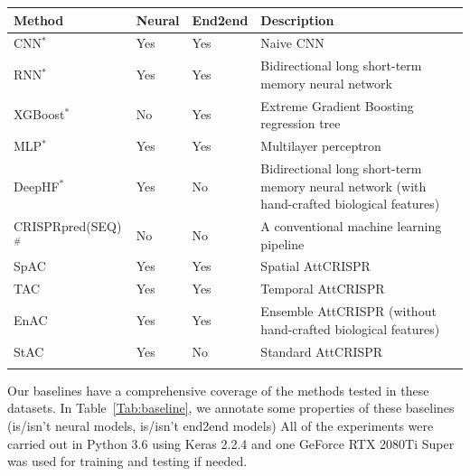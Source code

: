 \documentclass{bioinfo}
\begin{document}
\begin{table}[!tpb]
    {\begin{tabular}{@{}lllp{3.5cm}l@{}}\toprule
        Method & Neural & End2end & Description\\\midrule
        CNN$^*$ & Yes & Yes & Naive CNN\\
        RNN$^*$ & Yes & Yes & Bidirectional long short-term memory neural network\\
        XGBoost$^*$ & No & Yes & Extreme Gradient Boosting regression tree\\
        MLP$^*$ & Yes & Yes & Multilayer perceptron\\
        DeepHF$^*$ & Yes & No & Bidirectional long short-term memory neural network (with hand-crafted biological features)\\
        CRISPRpred(SEQ)$^{\#}$ & No & No & A conventional machine learning pipeline\\
        SpAC & Yes & Yes & Spatial AttCRISPR\\
        TAC & Yes & Yes & Temporal AttCRISPR\\
        EnAC & Yes & Yes & Ensemble AttCRISPR (without hand-crafted biological features)\\
        StAC & Yes & No & Standard AttCRISPR\\
        \botrule
    \end{tabular}}\footnotesize{}
\end{table}

Our baselines have a comprehensive coverage of the methods tested in these datasets. 
In Table~\ref{Tab:baseline}, we annotate some properties of these baselines (is/isn't neural models, is/isn't end2end models)
All of the experiments were carried out in Python 3.6 using Keras 2.2.4 and one GeForce RTX 2080Ti Super was used for training and testing if needed. 
\end{document}
